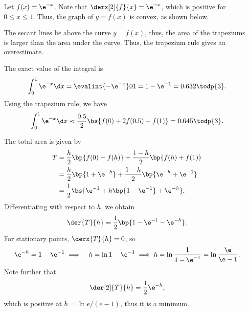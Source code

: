 \begin{solution}
    Let $f(x) = \e^{-x}$. Note that $\derx[2]{f}{x} = \e^{-x}$, which is positive for $0 \leq x \leq 1$. Thus, the graph of $y = f(x)$ is convex, as shown below.

    \begin{figure}[H]
        \centering
    \end{figure}

    The secant lines lie above the curve $y = f(x)$, thus, the area of the trapeziums is larger than the area under the curve. Thus, the trapezium rule gives an overestimate.

    The exact value of the integral is \[\int_0^1 \e^{-x} \d x = \evalint{-\e^{-x}}01 = 1 - \e^{-1} = 0.632 \todp{3}.\] Using the trapezium rule, we have \[\int_0^1 \e^{-x} \d x \approx \frac{0.5}{2} \bs{f(0) + 2f(0.5) + f(1)} = 0.645 \todp{3}.\]

    The total area is given by
    \begin{align*}
        T &= \frac{h}{2} \bp{f(0) + f(h)} + \frac{1-h}{2} \bp{f(h) + f(1)}\\
        &= \frac{h}2 \bp{1 + \e^{-h}} + \frac{1-h}{2} \bp{\e^{-h} + \e^{-1}}\\
        &= \frac12 \bs{\e^{-1} + h\bp{1 - \e^{-1}} + \e^{-h}}.
    \end{align*}
    Differentiating with respect to $h$, we obtain \[\der{T}{h} = \frac12 \bp{1 - \e^{-1} - \e^{-h}}.\] For stationary points, $\derx{T}{h} = 0$, so \[\e^{-h} = 1 - \e^{-1} \implies -h = \ln{1 - \e^{-1}} \implies h = \ln \frac1{1 - \e^{-1}} = \ln \frac{\e}{\e - 1}.\] Note further that \[\der[2]{T}{h} = \frac12 \e^{-h},\] which is positive at $h = \ln{e/(e-1)}$, thus it is a minimum.
\end{solution}

